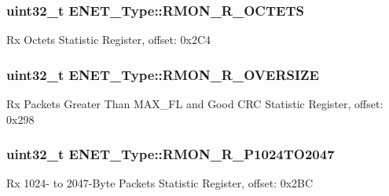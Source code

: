 \subsubsection[{\texorpdfstring{R\+M\+O\+N\+\_\+\+R\+\_\+\+O\+C\+T\+E\+TS}{RMON_R_OCTETS}}]{ uint32\+\_\+t E\+N\+E\+T\+\_\+\+Type\+::\+R\+M\+O\+N\+\_\+\+R\+\_\+\+O\+C\+T\+E\+TS}\hypertarget{structENET__Type_a5c550a933e0c2518bf9345140156101e}{}\label{structENET__Type_a5c550a933e0c2518bf9345140156101e}
Rx Octets Statistic Register, offset\+: 0x2\+C4 
\subsubsection[{\texorpdfstring{R\+M\+O\+N\+\_\+\+R\+\_\+\+O\+V\+E\+R\+S\+I\+ZE}{RMON_R_OVERSIZE}}]{ uint32\+\_\+t E\+N\+E\+T\+\_\+\+Type\+::\+R\+M\+O\+N\+\_\+\+R\+\_\+\+O\+V\+E\+R\+S\+I\+ZE}\hypertarget{structENET__Type_a93ea000c14e32486c6b115b1dc8772c3}{}\label{structENET__Type_a93ea000c14e32486c6b115b1dc8772c3}
Rx Packets Greater Than M\+A\+X\+\_\+\+FL and Good C\+RC Statistic Register, offset\+: 0x298 
\subsubsection[{\texorpdfstring{R\+M\+O\+N\+\_\+\+R\+\_\+\+P1024\+T\+O2047}{RMON_R_P1024TO2047}}]{ uint32\+\_\+t E\+N\+E\+T\+\_\+\+Type\+::\+R\+M\+O\+N\+\_\+\+R\+\_\+\+P1024\+T\+O2047}\hypertarget{structENET__Type_adf63beaa909de38a7ca243b3556755e2}{}\label{structENET__Type_adf63beaa909de38a7ca243b3556755e2}
Rx 1024-\/ to 2047-\/\+Byte Packets Statistic Register, offset\+: 0x2\+BC 
